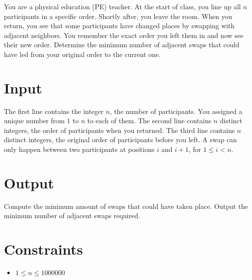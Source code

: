 
You are a physical education (PE) teacher. At the start of class, you line up all $n$ participants in a specific order. Shortly after, you leave the room.
When you return, you see that some participants have changed places by swapping with adjacent neighbors. You remember the exact order you left them in and now see their new order.
Determine the minimum number of adjacent swaps that could have led from your original order to the current one.

\section*{Input}
The first line contains the integer $n$, the number of participants. You assigned a unique number from $1$ to $n$ to each of them.
The second line contains $n$ distinct integers, the order of participants when you returned.
The third line contains $n$ distinct integers, the original order of participants before you left.
A swap can only happen between two participants at positions $i$ and $i + 1$, for $1 \leq i < n$.

\section*{Output}

Compute the minimum amount of swaps that could have taken place. Output the minimum number of adjacent swaps required.

\section*{Constraints}
\begin{itemize}
    \item $1 \leq n \leq 1 000 000$
\end{itemize}
